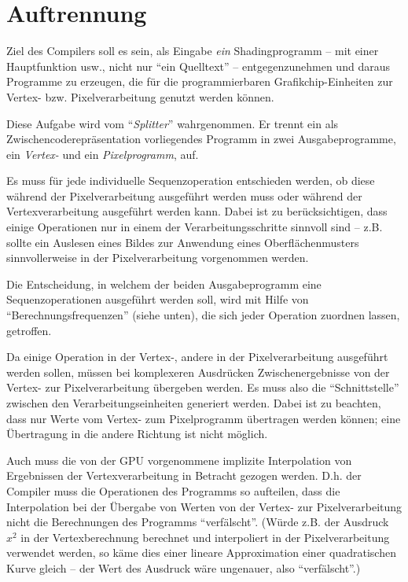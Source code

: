 \documentclass[twoside,a4paper,fleqn,12pt]{book}
\begin{document}
\newpage
\section{Auftrennung}
\label{Auftrennung}

Ziel des Compilers soll es sein, als Eingabe \emph{ein} Shadingprogramm -- mit einer Hauptfunktion usw., nicht nur "`ein Quelltext"' -- entgegenzunehmen
und daraus Programme zu erzeugen, die für die programmierbaren Grafikchip-Einheiten zur Vertex- bzw. Pixelverarbeitung genutzt werden können.

Diese Aufgabe wird vom "`\emph{Splitter}"' wahrgenommen.
Er trennt ein als Zwischencoderepräsentation vorliegendes Programm in zwei Ausgabeprogramme, ein \emph{Vertex-} und ein \emph{Pixelprogramm}, auf.



Es muss für jede individuelle Sequenzoperation entschieden werden, ob diese während der Pixelverarbeitung ausgeführt werden muss
oder während der Vertexverarbeitung ausgeführt werden kann.
Dabei ist zu berücksichtigen, dass einige Operationen nur in einem der Verarbeitungsschritte sinnvoll sind -- z.B. sollte ein Auslesen
eines Bildes zur Anwendung eines Oberflächenmusters sinnvollerweise in der Pixelverarbeitung vorgenommen werden.

Die Entscheidung, in welchem der beiden Ausgabeprogramm eine Sequenzoperationen ausgeführt werden soll,
wird mit Hilfe von "`Berechnungsfrequenzen"' (siehe unten), die sich jeder Operation zuordnen lassen, getroffen.

Da einige Operation in der Vertex-, andere in der Pixelverarbeitung ausgeführt werden sollen, müssen bei komplexeren
Ausdrücken Zwischenergebnisse von der Vertex- zur Pixelverarbeitung übergeben werden. Es muss also die "`Schnittstelle"'
zwischen den Verarbeitungseinheiten generiert werden.
Dabei ist zu beachten, dass nur Werte vom Vertex- zum Pixelprogramm übertragen werden können; %
eine Übertragung in die andere Richtung ist nicht möglich.

Auch muss die von der GPU vorgenommene implizite Interpolation von Ergebnissen der Vertexverarbeitung in Betracht
gezogen werden. D.h. der Compiler muss die Operationen des Programms so aufteilen, dass die Interpolation bei der Übergabe
von Werten von der Vertex- zur Pixelverarbeitung nicht die Berechnungen des Programms "`verfälscht"'. (Würde z.B. der Ausdruck 
$x^2$ in der Vertexberechnung berechnet und interpoliert in der Pixelverarbeitung verwendet werden, so käme dies einer
lineare Approximation einer quadratischen Kurve gleich -- der Wert des Ausdruck wäre ungenauer, also "`verfälscht"'.)
\end{document}

